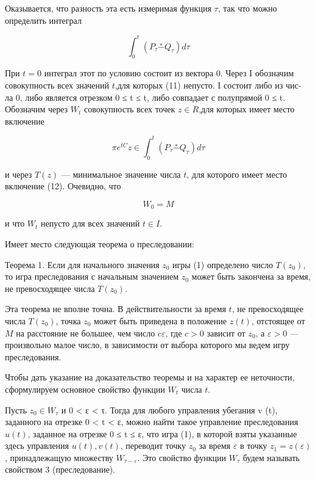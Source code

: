 \documentclass[10pt]{article}
\begin{document}
Оказывается, что разность эта есть измеримая функция \(\tau\), так что можно определить интеграл

\[
{\int }_{0}^{t}\left( {{P}_{\tau }\overset{ * }{ - }{Q}_{\tau }}\right) {d\tau } \tag{11}
\]

При \(t = 0\) интеграл этот по условию состоит из вектора 0. Через I обозначим совокупность всех значений \(t\),для которых (11) непусто. I состоит либо из чис- ла 0, либо является отрезком 0 ≤ t ≤ t, либо совпадает с полупрямой 0 ≤ t. Обозначим через \({W}_{t}\) совокупность всех точек \(z \in  R\),для которых имеет место включение

\[
\pi {e}^{tC}z \in  {\int }_{0}^{t}\left( {{P}_{\tau }\overset{ * }{ - }{Q}_{\tau }}\right) {d\tau } \tag{12}
\]

и через \(T\left( z\right)\) — минимальное значение числа \(t\), для которого имеет место включение (12). Очевидно, что

\[
{W}_{0} = M \tag{13}
\]

и что \({W}_{t}\) непусто для всех значений \(t \in  I\).

Имеет место следующая теорема о преследовании:

Теорема 1. Если для начального значения \(z_{0}\) игры (1) определено число \(T\left( {z}_{0}\right)\), то игра преследования с начальным значением \(z_{0}\) может быть закончена за время, не превосходящее числа \(T\left( {z}_{0}\right)\).

Эта теорема не вполне точна. В действительности за время \(t\), не превосходящее числа \(T\left( {z}_{0}\right)\), точка \({z}_{0}\) может быть приведена в положение \(z\left( t\right)\), отстоящее от \(M\) на расстояние не большее, чем число \(c\varepsilon\), где \(c > 0\) зависит от \({z}_{0}\), а \(\varepsilon > 0\) — произвольно малое число, в зависимости от выбора которого мы ведем игру преследования.

Чтобы дать указание на доказательство теоремы и на характер ее неточности, сформулируем основное свойство функции \({W}_{t}\) числа \(t\).

Пусть \({z}_{0} \in  {W}_{\tau }\) и 0 < ε < τ. Тогда для любого управления убегания v (t), заданного на отрезке 0 < t < ε, можно найти такое управление преследования \(u\left( t\right)\), заданное на отрезке 0 ≤ t ≤ ε, что игра (1), в которой взяты указанные здесь управления \(u\left( t\right),v\left( t\right)\), переводит точку \({z}_{0}\) за время \(\varepsilon\) в точку \({z}_{1} = z\left( \varepsilon \right)\), принадлежащую множеству \({W}_{\tau  - \varepsilon }\). Это свойство функции \({W}_{\tau }\) будем называть свойством 3 (преследование).
\end{document}
